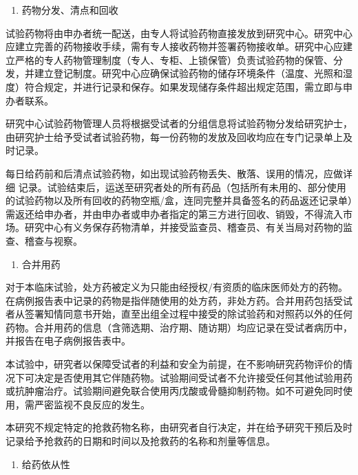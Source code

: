 \documentclass[
  chinese-hans,
  letterpaper,
  DIV=11,
  numbers=noendperiod]{scrreprt}
\providecommand{\tightlist}{%
  \setlength{\itemsep}{0pt}\setlength{\parskip}{0pt}}
\begin{document}
\begin{enumerate}
\def\labelenumi{\arabic{enumi}.}
\setcounter{enumi}{3}
\tightlist
\item
  药物分发、清点和回收
\end{enumerate}

试验药物将由申办者统一配送，由专人将试验药物直接发放到研究中心。研究中心应建立完善的药物接收手续，需有专人接收药物并签署药物接收单。研究中心应建立严格的专人药物管理制度（专人、专柜、上锁保管）负责试验药物的保管、分发，并建立登记制度。研究中心应确保试验药物的储存环境条件（温度、光照和湿度）符合规定，并进行记录和保存。如果发现储存条件超出规定范围，需立即与申办者联系。

研究中心试验药物管理人员将根据受试者的分组信息将试验药物分发给研究护士，由研究护士给予受试者试验药物，每一份药物的发放及回收均应在专门记录单上及时记录。

每日给药前和后清点试验药物，如出现试验药物丢失、散落、误用的情况，应做详细
记录。试验结束后，运送至研究者处的所有药品（包括所有未用的、部分使用的试验药物以及所有回收的药物空瓶/盒，连同完整并具备签名的药品返还记录单）需返还给申办者，并由申办者或申办者指定的第三方进行回收、销毁，不得流入市场。研究中心有义务保存药物清单，并接受监查员、稽查员、有关当局对药物的监查、稽查与视察。

\begin{enumerate}
\def\labelenumi{\arabic{enumi}.}
\setcounter{enumi}{4}
\tightlist
\item
  合并用药
\end{enumerate}

对于本临床试验，处方药被定义为只能由经授权/有资质的临床医师处方的药物。在病例报告表中记录的药物是指伴随使用的处方药，非处方药。合并用药包括受试者从签署知情同意书开始，直至出组全过程中接受的除试验药和对照药以外的任何药物。合并用药的信息（含筛选期、治疗期、随访期）均应记录在受试者病历中，并报告在电子病例报告表中。

本试验中，研究者以保障受试者的利益和安全为前提，在不影响研究药物评价的情况下可决定是否使用其它伴随药物。试验期间受试者不允许接受任何其他试验用药或抗肿瘤治疗。试验期间避免联合使用丙戊酸或骨髓抑制药物。如不可避免同时使用，需严密监视不良反应的发生。

本研究不规定特定的抢救药物名称，由研究者自行决定，并在给予研究干预后及时记录给予抢救药的日期和时间以及抢救药的名称和剂量等信息。

\begin{enumerate}
\def\labelenumi{\arabic{enumi}.}
\setcounter{enumi}{5}
\tightlist
\item
  给药依从性
\end{enumerate}
\end{document}

